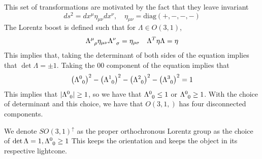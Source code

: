 \documentclass[11pt, oneside]{article}   	%
\theoremstyle{slanted}
\begin{document}
This set of transformations 
are motivated by the fact that 
they leave invariant 
\[
	ds ^ 2  = dx^ \mu \eta _{ \mu \nu } dx ^ \nu , \quad \eta _{ \mu \nu }  = \text{diag}\left( 
	+, - , - , - \right) 
\] The Lorentz boost is defined 
such that for $ \Lambda \in O \left( 3, 1  \right)  $, 
\[
 \Lambda \indices{ ^ \mu _ \rho } \eta _{ \mu \nu } \Lambda \indices{ ^ \nu _ \sigma } 
  = \eta_{ \rho \sigma } \quad \Lambda ^ T \eta \Lambda  =  \eta 
\] This implies that,
taking the determinant of both sides of the equation 
implies that $ \det \Lambda  = \pm 1 $. 
Taking the 00 component of the equation 
implies that 
\[
	\left( \Lambda \indices{ ^ 0 _ 0 }   \right)  ^ 2  - \left( \Lambda 
	\indices{ ^ 1 _ 0 }  \right)  ^ 2 - \left( \Lambda \indices{ ^ 2 _ 0 }   \right)  ^ 2 
	 - \left( \Lambda \indices{ ^ 3 _ 0 }   \right)  ^ 2  = 1
\] This implies that $ | \Lambda \indices{ ^ 0 _ 0 } | \geq 1  $, 
so we have that $ \Lambda \indices{ ^ 0 _ 0 } \leq 1   $ 
or $ \Lambda \indices{ ^ 0 _ 0 } \geq 1   $. 
With the choice of determinant and 
this choice, 
we have that $ O \left( 3, 1,  \right)  $ has 
four disconnected components. 

We denote $ SO  (3, 1 ) ^{ \uparrow } $ 
as the proper orthochronous Lorentz group 
as the choice of $ \det \Lambda  = 1 , \Lambda \indices{ ^ 0 _ 0} \geq 1   $  
This keeps the orientation and keeps the object 
in its respective lightcone. 
\end{document}
